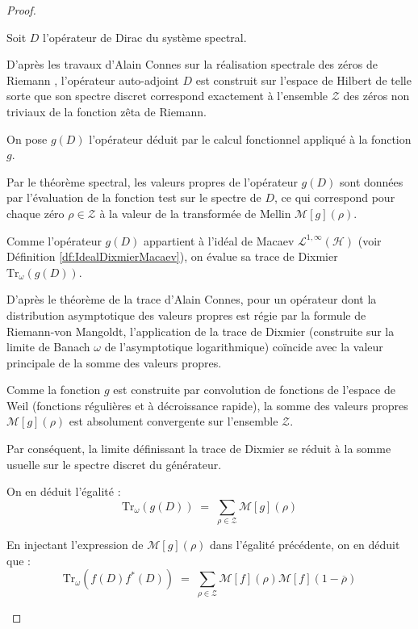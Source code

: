 \documentclass[Riemann_Hypothesis.tex]{subfiles}
\begin{document}
\begin{proof}
    
    \begin{part_proof}
        Soit $D$ l'opérateur de Dirac du système spectral. \par
        D'après les travaux d'Alain Connes sur la réalisation spectrale des zéros de Riemann \cite{connes1999_trace}, l'opérateur auto-adjoint $D$ est construit sur l'espace de Hilbert de telle sorte que son spectre discret correspond exactement à l'ensemble $\mathcal{Z}$ des zéros non triviaux de la fonction zêta de Riemann. \par
        On pose $g(D)$ l'opérateur déduit par le calcul fonctionnel appliqué à la fonction $g$. \par
        Par le théorème spectral, les valeurs propres de l'opérateur $g(D)$ sont données par l'évaluation de la fonction test sur le spectre de $D$, ce qui correspond pour chaque zéro $\rho \in \mathcal{Z}$ à la valeur de la transformée de Mellin $\mathcal{M}[g](\rho)$.
    \end{part_proof}
    \begin{part_proof}
        Comme l'opérateur $g(D)$ appartient à l'idéal de Macaev $\mathcal{L}^{1,\infty}(\mathcal{H})$ (voir Définition \ref{df:IdealDixmierMacaev}), on évalue sa trace de Dixmier $\mathrm{Tr}_{\omega}\left(g(D)\right)$. \par
        D'après le théorème de la trace d'Alain Connes, pour un opérateur dont la distribution asymptotique des valeurs propres est régie par la formule de Riemann-von Mangoldt, l'application de la trace de Dixmier (construite sur la limite de Banach $\omega$ de l'asymptotique logarithmique) coïncide avec la valeur principale de la somme des valeurs propres. \par
        Comme la fonction $g$ est construite par convolution de fonctions de l'espace de Weil (fonctions régulières et à décroissance rapide), la somme des valeurs propres $\mathcal{M}[g](\rho)$ est absolument convergente sur l'ensemble $\mathcal{Z}$. \par
        Par conséquent, la limite définissant la trace de Dixmier se réduit à la somme usuelle sur le spectre discret du générateur. \par
        On en déduit l'égalité :
        \begin{equation*}
            \mathrm{Tr}_{\omega}\left(g(D)\right) \;=\; \sum_{\rho\in\mathcal{Z}} \mathcal{M}[g](\rho)
        \end{equation*}
    
        En injectant l'expression de $\mathcal{M}[g](\rho)$ dans l'égalité précédente, on en déduit que :
        \begin{equation*}
            \mathrm{Tr}_{\omega}\left(f(D)f^*(D)\right) \;=\; \sum_{\rho\in\mathcal{Z}} \mathcal{M}[f](\rho) \mathcal{M}[f](1-\overline{\rho})
        \end{equation*}
    \end{part_proof}
\end{proof}
\end{document}
